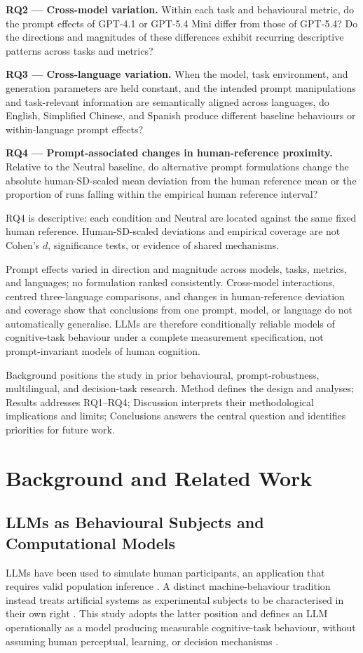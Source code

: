 \documentclass[logo,msc,inf]{infthesis}       %
\begin{document}
\noindent\textbf{RQ2 --- Cross-model variation.}
Within each task and behavioural metric, do the prompt effects of GPT-4.1 or GPT-5.4 Mini differ from those of GPT-5.4? Do the directions and magnitudes of these differences exhibit recurring descriptive patterns across tasks and metrics?

\noindent\textbf{RQ3 --- Cross-language variation.}
When the model, task environment, and generation parameters are held constant, and the intended prompt manipulations and task-relevant information are semantically aligned across languages, do English, Simplified Chinese, and Spanish produce different baseline behaviours or within-language prompt effects?

\noindent\textbf{RQ4 --- Prompt-associated changes in human-reference proximity.}
Relative to the Neutral baseline, do alternative prompt formulations change the absolute human-SD-scaled mean deviation from the human reference mean or the proportion of runs falling within the empirical human reference interval?

RQ4 is descriptive: each condition and Neutral are located against the same fixed human reference. Human-SD-scaled deviations and empirical coverage are not Cohen's \(d\), significance tests, or evidence of shared mechanisms.

Prompt effects varied in direction and magnitude across models, tasks, metrics, and languages; no formulation ranked consistently. Cross-model interactions, centred three-language comparisons, and changes in human-reference deviation and coverage show that conclusions from one prompt, model, or language do not automatically generalise. LLMs are therefore conditionally reliable models of cognitive-task behaviour under a complete measurement specification, not prompt-invariant models of human cognition.

Background positions the study in prior behavioural, prompt-robustness, multilingual, and decision-task research. Method defines the design and analyses; Results addresses RQ1--RQ4; Discussion interprets their methodological implications and limits; Conclusions answers the central question and identifies priorities for future work.

\chapter{Background and Related Work}
\section{LLMs as Behavioural Subjects and Computational Models}
LLMs have been used to simulate human participants, an application that requires valid population inference \cite{Dillion2023ReplaceParticipants}. A distinct machine-behaviour tradition instead treats artificial systems as experimental subjects to be characterised in their own right \cite{Rahwan2019MachineBehaviour,Hagendorff2023MachinePsychology}. This study adopts the latter position and defines an LLM operationally as a model producing measurable cognitive-task behaviour, without assuming human perceptual, learning, or decision mechanisms \cite{Lin2025SixFallacies}.
\end{document}

